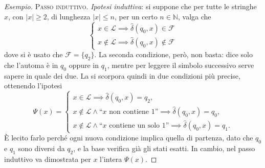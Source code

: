 \documentclass[a4paper, 11pt, oneside]{book}
\theoremstyle{formale}
\newenvironment{esempio}
    {\begin{proof}[\textit{Esempio}]\renewcommand{\qedsymbol}{$\diamond$}}
    {\end{proof}}
\begin{document}
\begin{esempio}
        \textsc{Passo induttivo}. \emph{Ipotesi induttiva}: si suppone che per tutte le
        stringhe $x$, con $|x| \geq 2$, di lunghezza $|x| \leq n$, per un certo
        $n \in \mathbb{N}$, valga che
        \begin{equation*}
            \begin{cases}
                x \in \mathcal{L} \implies \hat{\delta}(q_0, x) \in \mathcal{F}\\
                x \notin \mathcal{L} \implies \hat{\delta}(q_0, x) \notin \mathcal{F}
            \end{cases}
        \end{equation*}
        dove si \`e usato che $\mathcal{F} = \{q_2\}$. La seconda condizione, per\`o, non
        basta: dice solo che l'automa \`e in $q_0$ oppure in $q_1$, mentre per leggere il
        simbolo successivo serve sapere in quale dei due. La si scorpora quindi in due
        condizioni pi\`u precise, ottenendo l'ipotesi
        \begin{equation*}
            \Psi(x) =
            \begin{cases}
                x \in \mathcal{L} \implies \hat{\delta}(q_0, x) = q_2, \\
                x \notin \mathcal{L} \land \text{``$x$ non contiene $1$''}
                    \implies \hat{\delta}(q_0, x) = q_0, \\
                x \notin \mathcal{L} \land \text{``$x$ contiene un solo $1$''}
                    \implies \hat{\delta}(q_0, x) = q_1.
            \end{cases}
        \end{equation*}
        \`E lecito farlo perch\'e ogni nuova condizione implica quella di partenza, dato che
        $q_0$ e $q_1$ sono diversi da $q_2$, e la base verifica gi\`a gli stati esatti. In
        cambio, nel passo induttivo va dimostrata per $x$ l'intera $\Psi(x)$.


\end{esempio}
\end{document}
